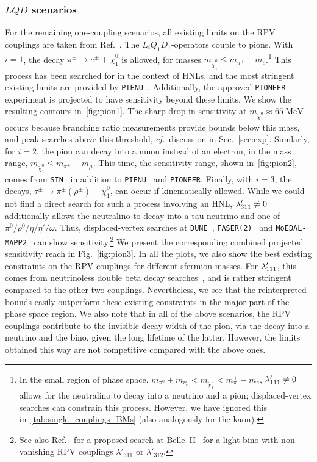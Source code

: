 \subsubsection{$LQ\bar{D}$ scenarios} 
%
For the remaining one-coupling scenarios, all existing limits on the RPV couplings are taken from 
Ref.~\cite{Dercks:2017lfq}. The $L_iQ_1\bar D_1$-operators couple to pions. With $i=1$, the decay $\pi^\pm 
\to e^\pm +\tilde{\chi}^0_1$ is allowed, for masses $m_{\tilde{\chi}^0_1} \le m_{\pi^{\pm}}-m_{e}$.\footnote{In
the small region of phase space, $m_{\pi^0}+m_{\nu_e} < m_{\tilde{\chi}^0_1} < m_\pi^\pm-m_e$, $\lambda
'_{111}\not=0$ allows for the neutralino to decay into a neutrino and a pion; displaced-vertex 
searches can constrain this process. However, we have ignored this in~\cref{tab:single_couplings_BMs}
(also analogously for the kaon).} This process has been searched for in the context of HNLs, and the
most stringent existing limits are provided by \texttt{PIENU}~\cite{PIENU:2017wbj}. Additionally, 
the approved \texttt{PIONEER}~\cite{PIONEER:2022alm} experiment is projected to have sensitivity 
beyond these limits. We show the resulting contours in~\cref{fig:pion1}. The sharp drop in sensitivity 
at $m_{\tilde{\chi}^0_1} \approx \SI{65}{\MeV}$ occurs
because branching ratio measurements provide bounds below this mass, and peak searches above this threshold, \textit{cf.}~discussion in Sec.~\ref{sec:exp}. Similarly, for $i=2$, the pion can 
decay into a muon instead of an electron, in the mass range, $m_{\tilde{\chi}^0_1} \le m_{\pi^{\pm}}
-m_{\mu}$. This time, the sensitivity range, shown in~\cref{fig:pion2}, comes from 
\texttt{SIN}~\cite{Daum:1987bg} in addition to \texttt{PIENU}~\cite{PIENU:2019usb} and \texttt{PIONEER}.
Finally, with $i=3$, the decays, $\tau^{\pm} \to \pi^{\pm} (\rho^\pm) + \tilde{\chi}^0_1$, can occur if 
kinematically allowed. While we could not find a direct search for such a process involving an HNL, 
$\lambda'_{311}\not=0$ additionally allows the neutralino to decay into a tau neutrino and one of 
$\pi^0/\rho^0/\eta/\eta'/\omega$. Thus, displaced-vertex searches at \texttt{DUNE}~\cite{Ballett:2019bgd}, 
\texttt{FASER(2)}~\cite{Kling:2018wct} and \texttt{MoEDAL-MAPP2}~\cite{DeVries:2020jbs,Beltran:2023nli} 
can show sensitivity.\footnote{See also Ref.~\cite{Dey:2020juy} for a proposed search at Belle~II~\cite{Belle-II:2010dht,Belle-II:2018jsg} for a light bino with non-vanishing RPV couplings $\lambda'_{311}$ or $\lambda'_{312}$.\label{footenote:belleII_LQD}}
We present the corresponding combined projected sensitivity reach in Fig.~\ref{fig:pion3}. In all the plots, we also show the best existing constraints on the RPV couplings for different sfermion masses.
For $\lambda'_{111}$, this comes from neutrinoless double beta decay searches~\cite{Hirsch:1998kc,Bolton:2021hje}, and is rather stringent compared to the other two couplings.
Nevertheless, we see that the reinterpreted bounds easily outperform these existing constraints in the major part of the phase space region.
We also note that in all of the above scenarios, the RPV couplings contribute to the invisible decay width of the pion, via the decay into a neutrino and the bino, given the long lifetime of the latter. However, the limits obtained this way are not competitive compared with the above ones.

